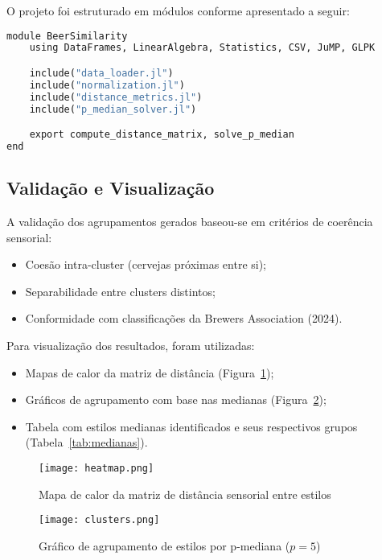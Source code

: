 \documentclass[12pt,a4paper]{article}
\begin{document}
O projeto foi estruturado em m\'odulos conforme apresentado a seguir:

\begin{lstlisting}[float,language=Python, caption=Estrutura modular do c\'odigo Julia]
module BeerSimilarity
    using DataFrames, LinearAlgebra, Statistics, CSV, JuMP, GLPK

    include("data_loader.jl")
    include("normalization.jl")
    include("distance_metrics.jl")
    include("p_median_solver.jl")

    export compute_distance_matrix, solve_p_median
end
\end{lstlisting}

\subsection{Valida\c{c}\~ao e Visualiza\c{c}\~ao}

A valida\c{c}\~ao dos agrupamentos gerados baseou-se em crit\'erios de coer\^encia sensorial:

\begin{itemize}
\item Coes\~ao intra-cluster (cervejas pr\'oximas entre si);
\item Separabilidade entre clusters distintos;
\item Conformidade com classifica\c{c}\~oes da Brewers Association (2024).
\end{itemize}

Para visualiza\c{c}\~ao dos resultados, foram utilizadas:

\begin{itemize}
\item Mapas de calor da matriz de dist\^ancia (Figura~\ref{fig:heatmap});
\item Gr\'aficos de agrupamento com base nas medianas (Figura~\ref{fig:clusters});
\item Tabela com estilos medianas identificados e seus respectivos grupos (Tabela~\ref{tab:medianas}).
\end{itemize}

\begin{figure}[H]
\centering
\texttt{[image: heatmap.png]}
\caption{Mapa de calor da matriz de dist\^ancia sensorial entre estilos}
\label{fig:heatmap}
\end{figure}

\begin{figure}[H]
\centering
\texttt{[image: clusters.png]}
\caption{Gr\'afico de agrupamento de estilos por p-mediana ($p=5$)}
\label{fig:clusters}
\end{figure}
\end{document}
